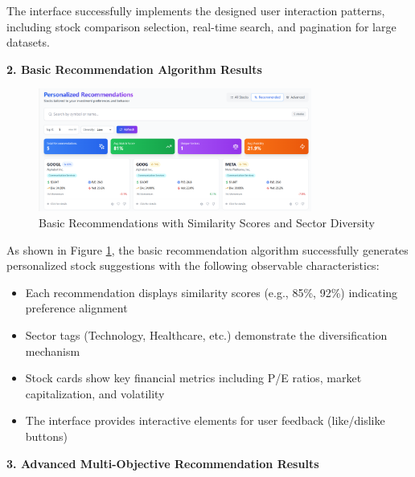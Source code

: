 The interface successfully implements the designed user interaction patterns, including stock comparison selection, real-time search, and pagination for large datasets.

\textbf{2. Basic Recommendation Algorithm Results}

\begin{figure}[h]
\centering
\includegraphics[width=0.8\textwidth]{images/stock_recommend/basic.png}
\caption{Basic Recommendations with Similarity Scores and Sector Diversity}
\label{fig:basic_recommendations}
\end{figure}

As shown in Figure \ref{fig:basic_recommendations}, the basic recommendation algorithm successfully generates personalized stock suggestions with the following observable characteristics:
\begin{itemize}
\item Each recommendation displays similarity scores (e.g., 85\%, 92\%) indicating preference alignment
\item Sector tags (Technology, Healthcare, etc.) demonstrate the diversification mechanism
\item Stock cards show key financial metrics including P/E ratios, market capitalization, and volatility
\item The interface provides interactive elements for user feedback (like/dislike buttons)
\end{itemize}

\textbf{3. Advanced Multi-Objective Recommendation Results}

